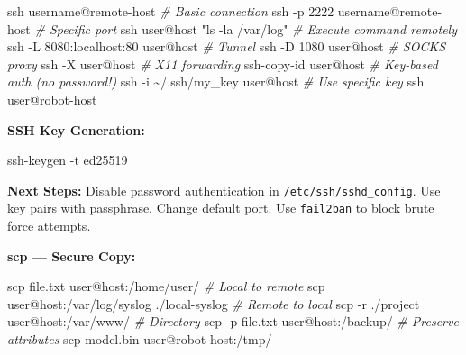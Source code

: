 \documentclass[
  english,
  paper=a4,
  oneside  ,captions=tableheading
]{scrartcl}
\newenvironment{Shaded}{}{}
\newcommand{\AttributeTok}[1]{\textcolor[rgb]{0.49,0.56,0.16}{#1}}
\newcommand{\CommentTok}[1]{\textcolor[rgb]{0.38,0.63,0.69}{\textit{#1}}}
\newcommand{\ExtensionTok}[1]{#1}
\newcommand{\FunctionTok}[1]{\textcolor[rgb]{0.02,0.16,0.49}{#1}}
\newcommand{\NormalTok}[1]{#1}
\newcommand{\StringTok}[1]{\textcolor[rgb]{0.25,0.44,0.63}{#1}}
\renewenvironment{quote}{\begin{customblockquote}\list{}{\rightmargin=0em\leftmargin=0em}%
\item\relax\color{blockquote-text}\ignorespaces}{\unskip\unskip\endlist\end{customblockquote}}
\begin{document}
\begin{Shaded}
\begin{Highlighting}[]
\FunctionTok{ssh}\NormalTok{ username@remote{-}host                         }\CommentTok{\# Basic connection}
\FunctionTok{ssh} \AttributeTok{{-}p}\NormalTok{ 2222 username@remote{-}host                 }\CommentTok{\# Specific port}
\FunctionTok{ssh}\NormalTok{ user@host }\StringTok{"ls {-}la /var/log"}                  \CommentTok{\# Execute command remotely}
\FunctionTok{ssh} \AttributeTok{{-}L}\NormalTok{ 8080:localhost:80 user@host               }\CommentTok{\# Tunnel}
\FunctionTok{ssh} \AttributeTok{{-}D}\NormalTok{ 1080 user@host                            }\CommentTok{\# SOCKS proxy}
\FunctionTok{ssh} \AttributeTok{{-}X}\NormalTok{ user@host                                 }\CommentTok{\# X11 forwarding}
\ExtensionTok{ssh{-}copy{-}id}\NormalTok{ user@host                            }\CommentTok{\# Key{-}based auth (no password!)}
\FunctionTok{ssh} \AttributeTok{{-}i}\NormalTok{ \textasciitilde{}/.ssh/my\_key user@host                   }\CommentTok{\# Use specific key}
\FunctionTok{ssh}\NormalTok{ user@robot{-}host}
\end{Highlighting}
\end{Shaded}

\textbf{SSH Key Generation:}

\begin{Shaded}
\begin{Highlighting}[]
\FunctionTok{ssh{-}keygen} \AttributeTok{{-}t}\NormalTok{ ed25519}
\end{Highlighting}
\end{Shaded}

\begin{quote}
\textbf{Next Steps:} Disable password authentication in
\texttt{/etc/ssh/sshd\_config}. Use key pairs with passphrase. Change
default port. Use \texttt{fail2ban} to block brute force attempts.
\end{quote}

\textbf{scp --- Secure Copy:}

\begin{Shaded}
\begin{Highlighting}[]
\FunctionTok{scp}\NormalTok{ file.txt user@host:/home/user/               }\CommentTok{\# Local to remote}
\FunctionTok{scp}\NormalTok{ user@host:/var/log/syslog ./local{-}syslog     }\CommentTok{\# Remote to local}
\FunctionTok{scp} \AttributeTok{{-}r}\NormalTok{ ./project user@host:/var/www/             }\CommentTok{\# Directory}
\FunctionTok{scp} \AttributeTok{{-}p}\NormalTok{ file.txt user@host:/backup/               }\CommentTok{\# Preserve attributes}
\FunctionTok{scp}\NormalTok{ model.bin user@robot{-}host:/tmp/}
\end{Highlighting}
\end{Shaded}
\end{document}
